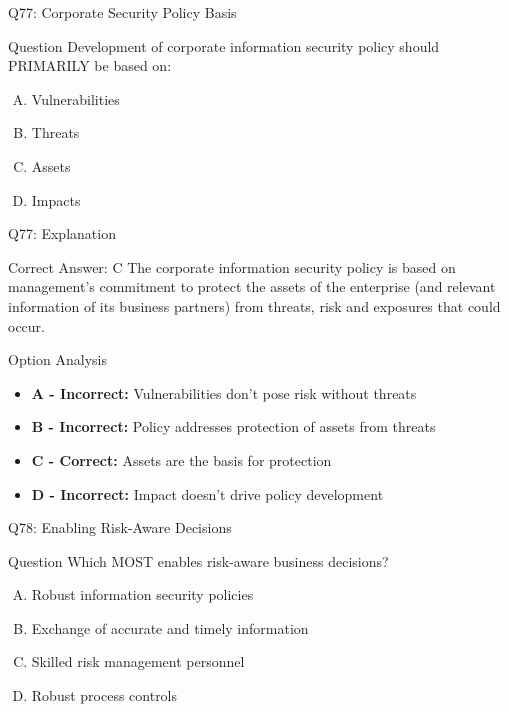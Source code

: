 \documentclass{beamer}
\begin{document}
	\begin{frame}{Q77: Corporate Security Policy Basis}
		\begin{block}{Question}
			Development of corporate information security policy should PRIMARILY be based on:
		\end{block}
		\begin{enumerate}[(A)]
			\item Vulnerabilities
			\item Threats
			\item Assets
			\item Impacts
		\end{enumerate}
	\end{frame}
	
	\begin{frame}{Q77: Explanation}
		\begin{block}{Correct Answer: C}
			The corporate information security policy is based on management's commitment to protect the assets of the enterprise (and relevant information of its business partners) from threats, risk and exposures that could occur.
		\end{block}
		\begin{block}{Option Analysis}
			\begin{itemize}
				\item \textbf{A - Incorrect:} Vulnerabilities don't pose risk without threats
				\item \textbf{B - Incorrect:} Policy addresses protection of assets from threats
				\item \textbf{C - Correct:} Assets are the basis for protection
				\item \textbf{D - Incorrect:} Impact doesn't drive policy development
			\end{itemize}
		\end{block}
	\end{frame}
	
	\begin{frame}{Q78: Enabling Risk-Aware Decisions}
		\begin{block}{Question}
			Which MOST enables risk-aware business decisions?
		\end{block}
		\begin{enumerate}[(A)]
			\item Robust information security policies
			\item Exchange of accurate and timely information
			\item Skilled risk management personnel
			\item Robust process controls
		\end{enumerate}
	\end{frame}
	
\end{document}
